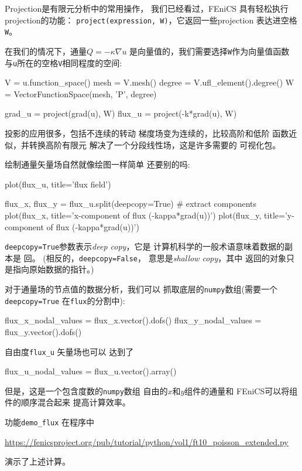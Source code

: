 
Projection是有限元分析中的常用操作，
我们已经看过，FEniCS
具有轻松执行projection的功能：
\texttt{project(expression, W)}，它返回一些projection
表达进空格\texttt{W}。

在我们的情况下，通量$Q=-\kappa\nabla u$
是向量值的，我们需要选择\texttt{W}作为向量值函数
与\texttt{u}所在的空格\texttt{V}相同程度的空间:

\begin{python}
V = u.function_space()
mesh = V.mesh()
degree = V.ufl_element().degree()
W = VectorFunctionSpace(mesh, 'P', degree)

grad_u = project(grad(u), W)
flux_u = project(-k*grad(u), W)
\end{python}

投影的应用很多，包括不连续的转动
梯度场变为连续的，比较高阶和低阶
函数近似，并转换高阶有限元
解决了一个分段线性场，这是许多需要的
可视化包。

绘制通量矢量场自然就像绘图一样简单
还要别的吗:

\begin{python}
plot(flux_u, title='flux field')

flux_x, flux_y = flux_u.split(deepcopy=True)  # extract components
plot(flux_x, title='x-component of flux (-kappa*grad(u))')
plot(flux_y, title='y-component of flux (-kappa*grad(u))')
\end{python}
\texttt{deepcopy=True}参数表示\emph{deep copy}，它是
计算机科学的一般术语意味着数据的副本是
回。 (相反的，\texttt{deepcopy=False}，
意思是\emph{shallow copy}，其中
返回的对象只是指向原始数据的指针。)


对于通量场的节点值的数据分析，我们可以
抓取底层的\texttt{numpy}数组(需要一个\texttt{deepcopy=True}
在\texttt{flux}的分割中):

\begin{python}
flux_x_nodal_values = flux_x.vector().dofs()
flux_y_nodal_values = flux_y.vector().dofs()
\end{python}
自由度\verb!flux_u! 矢量场也可以
达到了

\begin{python}
flux_u_nodal_values = flux_u.vector().array()
\end{python}
但是，这是一个包含度数的\texttt{numpy}数组
自由的$x$和$y$组件的通量和
FEniCS可以将组件的顺序混合起来
提高计算效率。

功能\verb!demo_flux! 在程序中
\begin{center}
\url{https://fenicsproject.org/pub/tutorial/python/vol1/ft10_poisson_extended.py}
\end{center}
演示了上述计算。

